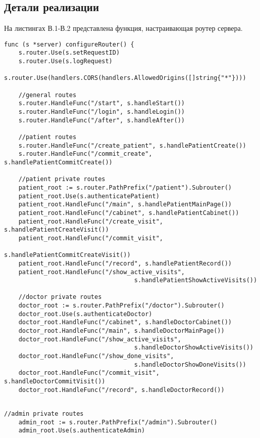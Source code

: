 \begin{appendices}
\chapter{Детали реализации}

На листингах В.1-В.2 представлена функция, настраивающая роутер сервера.

\begin{lstlisting}[caption={Настройка роутера}]
func (s *server) configureRouter() {
	s.router.Use(s.setRequestID)
	s.router.Use(s.logRequest)
	s.router.Use(handlers.CORS(handlers.AllowedOrigins([]string{"*"})))
	
	//general routes
	s.router.HandleFunc("/start", s.handleStart())
	s.router.HandleFunc("/login", s.handleLogin())
	s.router.HandleFunc("/after", s.handleAfter())
	
	//patient routes
	s.router.HandleFunc("/create_patient", s.handlePatientCreate())
	s.router.HandleFunc("/commit_create", s.handlePatientCommitCreate())
	
	//patient private routes
	patient_root := s.router.PathPrefix("/patient").Subrouter()
	patient_root.Use(s.authenticatePatient)
	patient_root.HandleFunc("/main", s.handlePatientMainPage())
	patient_root.HandleFunc("/cabinet", s.handlePatientCabinet())
	patient_root.HandleFunc("/create_visit", s.handlePatientCreateVisit())
	patient_root.HandleFunc("/commit_visit", 
									s.handlePatientCommitCreateVisit())
	patient_root.HandleFunc("/record", s.handlePatientRecord())
	patient_root.HandleFunc("/show_active_visits", 
									s.handlePatientShowActiveVisits())
	
	//doctor private routes
	doctor_root := s.router.PathPrefix("/doctor").Subrouter()
	doctor_root.Use(s.authenticateDoctor)
	doctor_root.HandleFunc("/cabinet", s.handleDoctorCabinet())
	doctor_root.HandleFunc("/main", s.handleDoctorMainPage())
	doctor_root.HandleFunc("/show_active_visits", 
									s.handleDoctorShowActiveVisits())
	doctor_root.HandleFunc("/show_done_visits", 
									s.handleDoctorShowDoneVisits())
	doctor_root.HandleFunc("/commit_visit", s.handleDoctorCommitVisit())
	doctor_root.HandleFunc("/record", s.handleDoctorRecord())
	
\end{lstlisting}
\clearpage
\begin{lstlisting}[caption={Настройка роутера(продолжение)}]
    //admin private routes
	admin_root := s.router.PathPrefix("/admin").Subrouter()
	admin_root.Use(s.authenticateAdmin)


\end{lstlisting}
\end{appendices}
